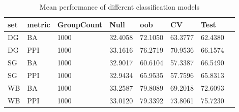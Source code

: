 \begin{table}
\centering
\begin{tabular}[0.2em]{@{}llllllll@{}}\toprule
set & metric & GroupCount & Null & oob & CV & Test\\\toprule[0.2em]
DG & BA & 1000 & 32.4058 & 72.1050 & 63.3777 & 62.4380 \\\midrule
DG & PPI & 1000 & 33.1616 & 76.2719 & 70.9536 & 66.1574 \\\midrule
SG & BA & 1000 & 32.9017 & 60.6104 & 57.3387 & 66.5490 \\\midrule
SG & PPI & 1000 & 32.9434 & 65.9535 & 57.7596 & 65.8313 \\\midrule
WB & BA & 1000 & 33.2587 & 79.8089 & 69.2018 & 72.6093 \\\midrule
WB & PPI & 1000 & 33.0120 & 79.3392 & 73.8061 & 75.7230 \\\bottomrule[0.2em]
\end{tabular}
\caption{Mean performance of different classification models\label{tabel:ClassificationMeanPerf}}
\end{table}
